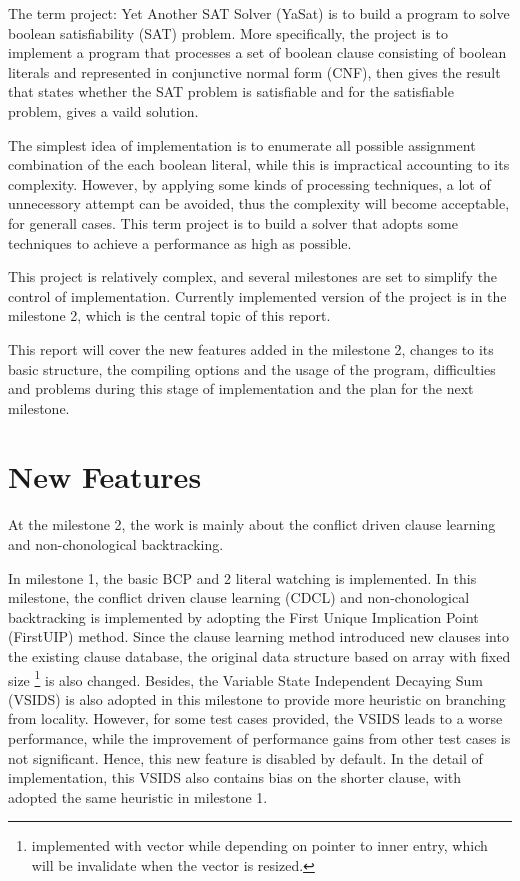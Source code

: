 \documentclass[a4paper, 11.5pt]{article}
\begin{document}
  \begin{multicols}{2}

  The term project: Yet Another SAT Solver (YaSat) is to build a program to solve boolean satisfiability (SAT) problem. More specifically, the project is to implement a program 
  that processes a set of boolean clause consisting of boolean literals and represented in 
  conjunctive normal form (CNF), then gives the result that states whether the SAT problem is
  satisfiable and for the satisfiable problem, gives a vaild solution. 

  The simplest idea of implementation is to enumerate all possible assignment combination 
  of the each boolean literal, while this is impractical accounting to its complexity. 
  However, by applying some kinds of processing techniques, a lot of unnecessory attempt can be 
  avoided, thus the complexity will become acceptable, for generall cases. This term project is 
  to build a solver that adopts some techniques to achieve a performance as high as possible.

  This project is relatively complex, and several milestones are set to simplify the control of 
  implementation. Currently implemented version of the project is in the milestone 2, which is the 
  central topic of this report. 

  This report will cover the new features added in the milestone 2, changes to its basic structure, 
  the compiling options and the usage of the program, difficulties and problems during this stage of implementation and the plan for the next milestone.

  \section{New Features}
    At the milestone 2, the work is mainly about the conflict driven clause learning and non-chonological backtracking.

    In milestone 1, the basic BCP and 2 literal watching is implemented. In this milestone,
    the conflict driven clause learning (CDCL) and non-chonological backtracking is implemented 
    by adopting the First Unique Implication Point (FirstUIP) method. Since the clause learning 
    method introduced new clauses into the existing clause database, the original data structure 
    based on array with fixed size 
    \footnote{implemented with vector while depending on pointer to inner entry, which will be invalidate when the vector is resized.}
    is also changed. Besides, the Variable State Independent Decaying Sum (VSIDS) is also adopted
    in this milestone to provide more heuristic on branching from locality. However, for some test
    cases provided, the VSIDS leads to a worse performance, while the improvement of performance 
    gains from other test cases is not significant. Hence, this new feature is disabled by default.
    In the detail of implementation, this VSIDS also contains bias on the shorter clause, with adopted 
    the same heuristic in milestone 1.


\end{multicols}
\end{document}
